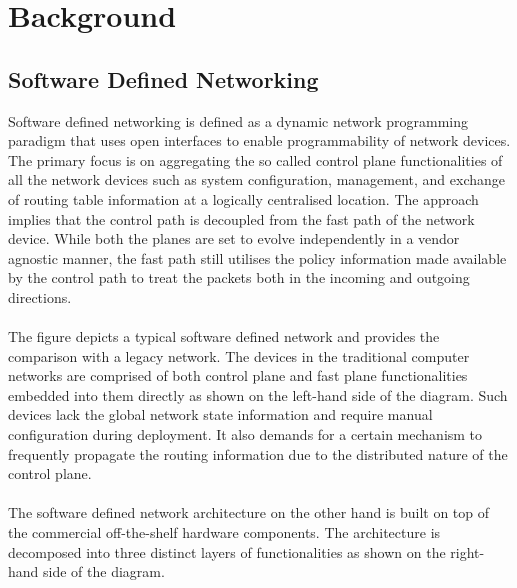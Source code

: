 \chapter{Background} 

\section{Software Defined Networking}
Software defined networking is defined as a dynamic network programming paradigm that uses open interfaces to enable programmability of network devices. The primary focus is on aggregating the so called control plane functionalities of all the network devices such as system configuration, management, and exchange of routing table information at a logically centralised location. The approach implies that the control path is decoupled from the fast path of the network device. While both the planes are set to evolve independently in a vendor agnostic manner, the fast path still utilises the policy information made available by the control path to treat the packets both in the incoming and outgoing directions.\\\\The figure depicts a typical software defined network and provides the comparison with a legacy network. The devices in the traditional computer networks are comprised of both control plane and fast plane functionalities embedded into them directly as shown on the left-hand side of the diagram. Such devices lack the global network state information and require manual configuration during deployment. It also demands for a certain mechanism to frequently propagate the routing information due to the distributed nature of the control plane.\\\\ The software defined network architecture on the other hand is built on top of the commercial off-the-shelf hardware components. The architecture is decomposed into three distinct layers of functionalities as shown on the right-hand side of the diagram.\\
